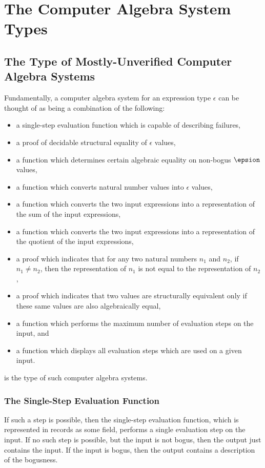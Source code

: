 \documentclass{report}
\begin{document}
\chapter{The Computer Algebra System Types}

\section{The Type of Mostly-Unverified Computer Algebra Systems}
Fundamentally, a computer algebra system for an expression type \(\epsilon\) can be thought of as being a combination of the following:

\begin{itemize}
  \item a single-step evaluation function which is capable of describing failures,
  \item a proof of decidable structural equality of \(\epsilon\) values,
  \item a function which determines certain algebraic equality on non-bogus \(\epsion\) values,
  \item a function which converts natural number values into \(\epsilon\) values,
  \item a function which converts the two input expressions into a representation of the sum of the input expressions,
  \item a function which converts the two input expressions into a representation of the quotient of the input expressions,
  \item a proof which indicates that for any two natural numbers \(n_1\) and \(n_2\), if \(n_1 \neq n_2\), then the representation of \(n_1\) is not equal to the representation of \(n_2\),
  \item a proof which indicates that two values are structurally equivalent only if these same values are also algebraically equal,
  \item a function which performs the maximum number of evaluation steps on the input, and
  \item a function which displays all evaluation steps which are used on a given input.
\end{itemize}

 is the type of such computer algebra systems.

\subsection{The Single-Step Evaluation Function}
If such a step is possible, then the single-step evaluation function, which is represented in  records as some  field, performs a single evaluation step on the input.  If no such step is possible, but the input is not bogus, then the output just contains the input.  If the input is bogus, then the output contains a description of the bogusness.
\end{document}
